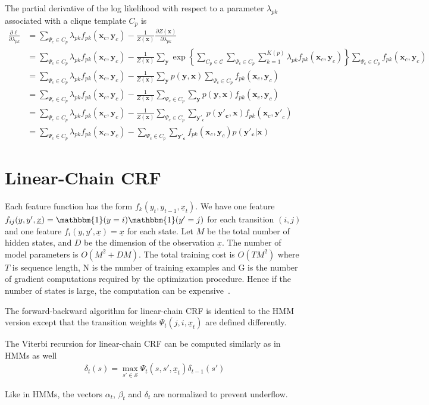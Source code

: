 The partial derivative of the log likelihood with respect to a parameter
$\lambda_{pk}$ associated with a clique template $C_p$ is
\begin{align}
\frac{\partial\ell}{\partial\lambda_{pk}}
&= \sum_{\Psi_c\in C_p}\lambda_{pk}f_{pk}(\mathbf{x}_c, \mathbf{y}_c) -
\frac{1}{Z(\mathbf{x})}\frac{\partial Z(\mathbf{x})}{\partial\lambda_{pk}}\\
&= \sum_{\Psi_c\in C_p}\lambda_{pk}f_{pk}(\mathbf{x}_c, \mathbf{y}_c) -
\frac{1}{Z(\mathbf{x})}\sum_{\mathbf{y}}\exp\left\{\sum_{C_p\in\mathcal{C}}\sum_{\Psi_c\in
C_p}\sum_{k=1}^{K(p)}\lambda_{pk}f_{pk}(\mathbf{x}_c,
\mathbf{y}_c)\right\}\sum_{\Psi_c\in C_p}f_{pk}(\mathbf{x}_c, \mathbf{y}_c) \\
&= \sum_{\Psi_c\in C_p}\lambda_{pk}f_{pk}(\mathbf{x}_c, \mathbf{y}_c) -
\frac{1}{Z(\mathbf{x})}\sum_{\mathbf{y}}p(\mathbf{y}, \mathbf{x})\sum_{\Psi_c\in
C_p}f_{pk}(\mathbf{x}_c, \mathbf{y}_c) \\
&= \sum_{\Psi_c\in C_p}\lambda_{pk}f_{pk}(\mathbf{x}_c, \mathbf{y}_c) -
\frac{1}{Z(\mathbf{x})}\sum_{\Psi_c\in C_p}\sum_{\mathbf{y}}p(\mathbf{y},
\mathbf{x})f_{pk}(\mathbf{x}_c, \mathbf{y}_c) \\
&= \sum_{\Psi_c\in C_p}\lambda_{pk}f_{pk}(\mathbf{x}_c, \mathbf{y}_c) -
\frac{1}{Z(\mathbf{x})}\sum_{\Psi_c\in C_p}\sum_{\mathbf{y'_c}}p(\mathbf{y'_c},
\mathbf{x})f_{pk}(\mathbf{x}_c, \mathbf{y'}_c) \\
&= \sum_{\Psi_c\in C_p}\lambda_{pk}f_{pk}(\mathbf{x}_c, \mathbf{y}_c) -
\sum_{\Psi_c\in C_p}\sum_{\mathbf{y'_c}}f_{pk}(\mathbf{x}_c, \mathbf{y}_c)p(\mathbf{y'_c}
| \mathbf{x})
\end{align}

\section{Linear-Chain CRF}\label{sec:linear-crf}
Each feature function has the form $f_k(y_t, y_{t-1},
\underline{x}_t)$.
We have one feature $f_{ij}(y, y', \underline{x}) =
\mathbbm{1}(y=i)\mathbbm{1}(y'=j)$ for each transition $(i, j)$ and one feature
$f_i(y, y', \underline{x}) = \underline{x}$ for each state.
Let $M$ be the total number of hidden states, and $D$ be the dimension of the
observation $\underline{x}$. The number of model parameters is $O(M^2 + DM)$.
The total training cost is $O(TM^2)$ where $T$ is sequence length, N is the
number of training examples and G is the number of gradient computations
required by the optimization procedure. Hence if the number of states is large,
the computation can be expensive~\cite{sutton06}.

The forward-backward algorithm for linear-chain CRF is identical to the HMM
version except that the transition weights $\Psi_t(j, i, \underline{x}_t)$ are
defined differently.

The Viterbi recursion for linear-chain CRF can be computed similarly as in HMMs
as well
\begin{align*}
\delta_t(s) = \max_{s'\in \mathcal{S}}\Psi_t(s, s',
\underline{x}_t)\delta_{t-1}(s')
\end{align*}

Like in HMMs, the vectors $\alpha_t$, $\beta_t$ and $\delta_t$ are normalized to
prevent underflow.
